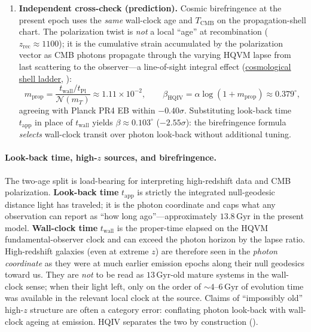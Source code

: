\documentclass[11pt]{amsart}
\newcommand{\leanid}[1]{{\footnotesize\path{#1}}}
\begin{document}
\begin{enumerate}[label=(\arabic*),leftmargin=2em,nosep]
\[\]
using the stars-and-bars propagation count $\mathcal{N}(m)=(m+2)(m+1)$. The predicted monopole temperature is
\[
  T_{\mathrm{CMB}}^{\mathrm{HQIV}}
  =\frac{T_{\mathrm{Pl}}}{m_T+1}
  \approx 2.7255\,\mathrm{K},
\]
to be compared with FIRAS \cite{fixsen2009} (equivalently $m_T=T_{\mathrm{Pl}}/T_{\mathrm{CMB}}^{\mathrm{obs}}-1$ as a verification identity). Recombination redshift follows structurally: $(N_{\mathrm{now}}+1)/(N_{\mathrm{rec}}+1)=T_{\mathrm{rec}}/T_{\mathrm{now}}\approx 1100$ at $T_{\mathrm{rec}}\approx 3000\,\mathrm{K}$, again without a separate fit.
\item \textbf{Independent cross-check (prediction).} Cosmic birefringence at the present epoch uses the \emph{same} wall-clock age and $T_{\mathrm{CMB}}$ on the propagation-shell chart. The polarization twist is \emph{not} a local ``age'' at recombination ($z_{\mathrm{rec}}\approx 1100$); it is the cumulative strain accumulated by the polarization vector as CMB photons propagate through the varying HQVM lapse from last scattering to the observer---a line-of-sight integral effect (\hyperref[lean:cosmological-shell-ladder]{cosmological shell ladder}, \cite{hqiv-kirchhoff-paper}):
\[
  m_{\mathrm{prop}}=\frac{t_{\mathrm{wall}}/t_{\mathrm{Pl}}}{\mathcal{N}(m_T)}\approx 1.11\times 10^{-2},
  \qquad
  \beta_{\mathrm{HQIV}}=\alpha\log(1+m_{\mathrm{prop}})\approx 0.379^\circ,
\]
agreeing with Planck PR4 EB within $-0.40\sigma$. Substituting look-back time $t_{\mathrm{app}}$ in place of $t_{\mathrm{wall}}$ yields $\beta\approx 0.103^\circ$ ($-2.55\sigma$): the birefringence formula \emph{selects} wall-clock transit over photon look-back without additional tuning.
\end{enumerate}

\paragraph{Look-back time, high-$z$ sources, and birefringence.}
The two-age split is load-bearing for interpreting high-redshift data and CMB polarization. \textbf{Look-back time} $t_{\mathrm{app}}$ is strictly the integrated null-geodesic distance light has traveled; it is the photon coordinate and caps what any observation can report as ``how long ago''---approximately $13.8\,\mathrm{Gyr}$ in the present model. \textbf{Wall-clock time} $t_{\mathrm{wall}}$ is the proper-time elapsed on the HQVM fundamental-observer clock and can exceed the photon horizon by the lapse ratio. High-redshift galaxies (even at extreme $z$) are therefore seen in the \emph{photon coordinate} as they were at much earlier emission epochs along their null geodesics toward us. They are \emph{not} to be read as $13\,\mathrm{Gyr}$-old mature systems in the wall-clock sense; when their light left, only on the order of $\sim 4$--$6\,\mathrm{Gyr}$ of evolution time was available in the relevant local clock at the source. Claims of ``impossibly old'' high-$z$ structure are often a category error: conflating photon look-back with wall-clock ageing at emission. HQIV separates the two by construction (\leanid{UniverseAge.lean}).
\end{document}
